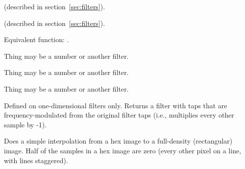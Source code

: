 \begin{description}
\item{}
(described in section~\ref{sec:filters}).

\item{}
(described in section~\ref{sec:filters}).

\item{}

\item{}

\item{}

\item{}
Equivalent function: .

\item{}

\item{}

\item{}

\item{}

\item{}
Thing may be a number or another filter.

\item{}
Thing may be a number or another filter.

\item{}
Thing may be a number or another filter.

\item{}
Defined on one-dimensional filters only.  Returns a filter with taps
that are frequency-modulated from the original filter taps (i.e.,
multiplies every other sample by -1).

\item{}
Does a simple interpolation from a hex image to a full-density
(rectangular) image.  Half of the samples in a hex image are zero
(every other pixel on a line, with lines staggered).
\end{description}


